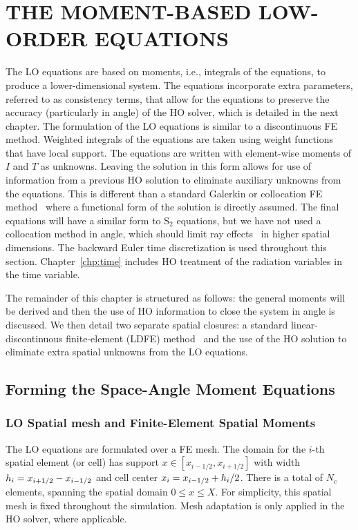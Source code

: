 
\chapter{\uppercase{The Moment-Based Low-Order Equations}}
\label{chp:lo}

The LO equations are based on moments, i.e., integrals of the equations, to produce a
lower-dimensional system.  The equations incorporate extra parameters, referred to as
consistency terms, that allow for the equations to preserve the accuracy (particularly in
angle) of the HO solver, which is detailed in the next chapter. 
The formulation of the LO equations is similar to a discontinuous FE method.  Weighted
integrals of the equations are taken using weight functions that have local support. 
The equations are written with element-wise moments of $I$ and $T$ as
unknowns.  Leaving the solution in this form allows for use of information from a
previous HO solution to eliminate auxiliary unknowns from the equations. This is different
than a standard Galerkin or collocation FE
method~\cite{fe_book,morel_notes} where a
functional form of the solution is directly assumed. The final equations will have a
similar form to S$_2$ equations, but we have not used a collocation method in angle,
which should limit ray effects~\cite{morel_notes,lewis} in higher spatial dimensions.
The backward Euler time discretization is used throughout this section.
Chapter~\ref{chp:time} includes HO treatment of the radiation variables in the time
variable.

The remainder of this chapter is structured as follows: the general moments will be
derived and then the use of HO information to close the system in angle is discussed.
We then detail two separate spatial closures: a standard linear-discontinuous finite-element (LDFE)
method~\cite{morel_ldtrt} and the use of the HO solution to eliminate extra
spatial unknowns from the LO equations.  

\section{Forming the Space-Angle Moment Equations}

\subsection{LO Spatial mesh and Finite-Element Spatial Moments}

The LO equations are formulated over a FE mesh.  The domain for the $i$-th spatial
element (or cell) has support $x\in[x_{i-1/2},x_{i+1/2}]$ with width $h_i=x_{i+1/2} -
x_{{i-1/2}}$ and cell center 
$x_i = x_{{i-1/2}} + h_i/2$.  There is a total of $N_c$ elements, spanning the
spatial domain $0\leq x\leq X$.  For simplicity, this spatial mesh is fixed throughout the
simulation.  Mesh adaptation is only applied in the HO solver, where applicable.

